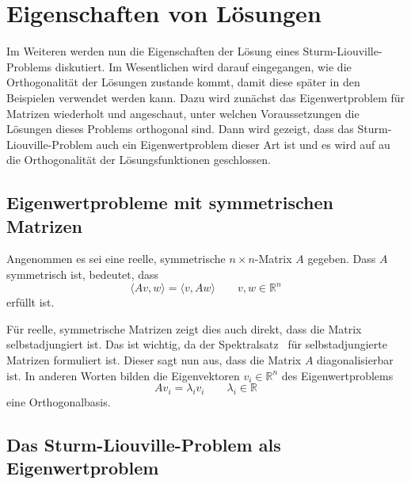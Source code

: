 %
%
%

\section{Eigenschaften von Lösungen
\label{sturmliouville:sec:solution-properties}}

Im Weiteren werden nun die Eigenschaften der Lösung eines
Sturm-Liouville-Problems diskutiert.
Im Wesentlichen wird darauf eingegangen, wie die Orthogonalität der Lösungen
zustande kommt, damit diese später in den Beispielen verwendet werden kann.
Dazu wird zunächst das Eigenwertproblem für Matrizen wiederholt und angeschaut,
unter welchen Voraussetzungen die Lösungen dieses Problems orthogonal sind.
Dann wird gezeigt, dass das Sturm-Liouville-Problem auch ein Eigenwertproblem
dieser Art ist und es wird auf au die Orthogonalität der Lösungsfunktionen
geschlossen.

\subsection{Eigenwertprobleme mit symmetrischen Matrizen
\label{sturmliouville:sec:eigenvalue-problem-matrix}}


Angenommen es sei eine reelle, symmetrische $n \times n$-Matrix $A$ gegeben.
%
%
Dass $A$ symmetrisch ist, bedeutet, dass
\[
    \langle Av, w \rangle
    =
    \langle v, Aw \rangle
    \qquad
    v, w \in \mathbb{R}^n
\]
erfüllt ist.

Für reelle, symmetrische Matrizen zeigt dies auch direkt, dass die Matrix
selbstadjungiert ist.
Das ist wichtig, da der Spektralsatz~\cite{sturmliouville:spektralsatz-wiki}
%
für selbstadjungierte Matrizen formuliert ist. Dieser sagt nun aus, dass die
%
%
Matrix $A$ diagonalisierbar ist.
In anderen Worten bilden die Eigenvektoren $v_i \in \mathbb{R}^n$ des 
Eigenwertproblems
\[
    A v_i
    =
    \lambda_i v_i
    \qquad \lambda_i \in \mathbb{R}
\]
eine Orthogonalbasis.

\subsection{Das Sturm-Liouville-Problem als Eigenwertproblem}

